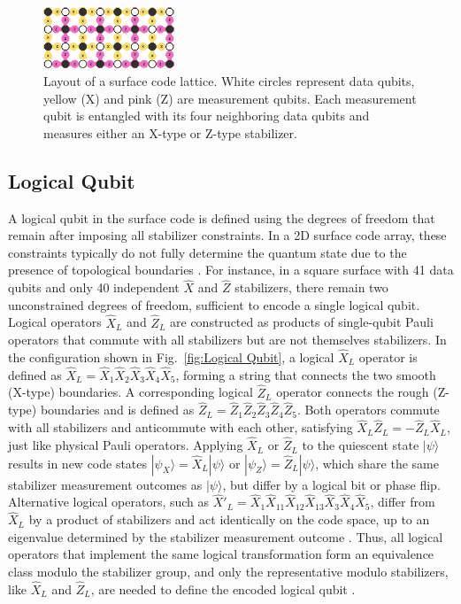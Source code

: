 \documentclass[9pt,a4paper,twocolumn,twoside]{tau-class/tau}
\begin{document}
\begin{figure}[htbp]
    \centering
    \includegraphics[width=0.35\textwidth]{figures/Surface Code Example.png}
    \caption{Layout of a surface code lattice. White circles represent data qubits, yellow (X) and pink (Z) are measurement qubits. Each measurement qubit is entangled with its four neighboring data qubits and measures either an X-type or Z-type stabilizer.}
    \label{fig:layout}
\end{figure}

\subsection{Logical Qubit}
A logical qubit in the surface code is defined using the degrees of freedom that remain after imposing all stabilizer constraints. In a 2D surface code array, these constraints typically do not fully determine the quantum state due to the presence of topological boundaries \cite{fowler2012surface}. For instance, in a square surface with 41 data qubits and only 40 independent $\hat{X}$ and $\hat{Z}$ stabilizers, there remain two unconstrained degrees of freedom, sufficient to encode a single logical qubit. Logical operators $\hat{X}_L$ and $\hat{Z}_L$ are constructed as products of single-qubit Pauli operators that commute with all stabilizers but are not themselves stabilizers. In the configuration shown in Fig.~\ref{fig:Logical Qubit}, a logical $\hat{X}_L$ operator is defined as $\hat{X}_L = \hat{X}_1 \hat{X}_2 \hat{X}_3 \hat{X}_4 \hat{X}_5$, forming a string that connects the two smooth (X-type) boundaries. A corresponding logical $\hat{Z}_L$ operator connects the rough (Z-type) boundaries and is defined as $\hat{Z}_L = \hat{Z}_1 \hat{Z}_2 \hat{Z}_3 \hat{Z}_4 \hat{Z}_5$. Both operators commute with all stabilizers and anticommute with each other, satisfying $\hat{X}_L \hat{Z}_L = -\hat{Z}_L \hat{X}_L$, just like physical Pauli operators. Applying $\hat{X}_L$ or $\hat{Z}_L$ to the quiescent state $|\psi\rangle$ results in new code states $|\psi_X\rangle = \hat{X}_L |\psi\rangle$ or $|\psi_Z\rangle = \hat{Z}_L |\psi\rangle$, which share the same stabilizer measurement outcomes as $|\psi\rangle$, but differ by a logical bit or phase flip. Alternative logical operators, such as $\hat{X}'_L = \hat{X}_1 \hat{X}_{11} \hat{X}_{12} \hat{X}_{13} \hat{X}_3 \hat{X}_4 \hat{X}_5$, differ from $\hat{X}_L$ by a product of stabilizers and act identically on the code space, up to an eigenvalue determined by the stabilizer measurement outcome \cite{fowler2012surface}. Thus, all logical operators that implement the same logical transformation form an equivalence class modulo the stabilizer group, and only the representative modulo stabilizers, like $\hat{X}_L$ and $\hat{Z}_L$, are needed to define the encoded logical qubit \cite{fowler2012surface}.
\end{document}
